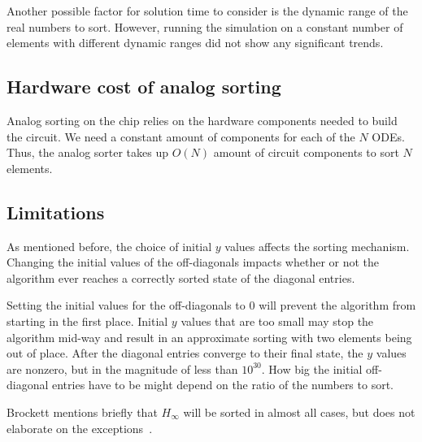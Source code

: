 Another possible factor for solution time to consider is the dynamic range of the real numbers to sort. However, running the simulation on a constant number of elements with different dynamic ranges did not show any significant trends.

\subsection{Hardware cost of analog sorting}

Analog sorting on the chip relies on the hardware components needed to build the circuit. 
We need a constant amount of components for each of the $N$ ODEs.
Thus, the analog sorter takes up $O(N)$ amount of circuit components to sort $N$ elements.


\subsection{Limitations}

As mentioned before, the choice of initial $y$ values affects the sorting mechanism. Changing the initial values of the off-diagonals impacts whether or not the algorithm ever reaches a correctly sorted state of the diagonal entries.

Setting the initial values for the off-diagonals to $0$ will prevent the algorithm from starting in the first place. Initial $y$ values that are too small may stop the algorithm mid-way and result in an approximate sorting with two elements being out of place. After the diagonal entries converge to their final state, the $y$ values are nonzero, but in the magnitude of less than $10^{30}$. How big the initial off-diagonal entries have to be might depend on the ratio of the numbers to sort.

Brockett mentions briefly that $H_\infty$ will be sorted in almost all cases, but does not elaborate on the exceptions~\cite{brockett}.




